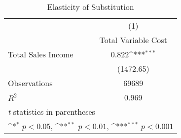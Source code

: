 \begin{table}[b]\centering
\def\sym#1{\ifmmode^{#1}\else\(^{#1}\)\fi}
\caption{Elasticity of Substitution}
\label{elasticity}
\begin{tabular}{l*{1}{c}}
\hline\hline
                    &\multicolumn{1}{c}{(1)}\\
                    &\multicolumn{1}{c}{Total Variable Cost}\\
\hline
Total Sales Income  &       0.822\sym{***}\\
                    &   (1472.65)         \\
\hline
Observations        &       69689         \\
\(R^{2}\)           &       0.969         \\
\hline\hline
\multicolumn{2}{l}{\footnotesize \textit{t} statistics in parentheses}\\
\multicolumn{2}{l}{\footnotesize \sym{*} \(p<0.05\), \sym{**} \(p<0.01\), \sym{***} \(p<0.001\)}\\
\end{tabular}
\end{table}

